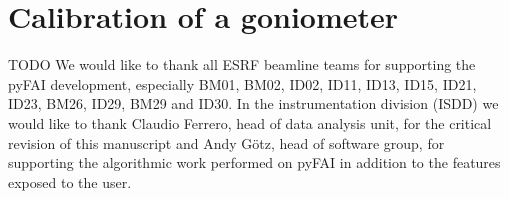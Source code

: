 \documentclass{iucr}              %
\begin{document}
\section{Calibration of a goniometer}


TODO
We would like to thank all ESRF beamline teams for supporting the
pyFAI development, especially BM01, BM02, ID02, ID11, ID13, ID15, ID21, ID23,
BM26, ID29, BM29 and ID30.
In the instrumentation division (ISDD) we would like to thank Claudio
Ferrero, head of data analysis unit, for the critical revision of this
manuscript and Andy G\"otz, head of software group, for supporting the
algorithmic work performed on pyFAI in addition to the features exposed to the
user.
\end{document}
